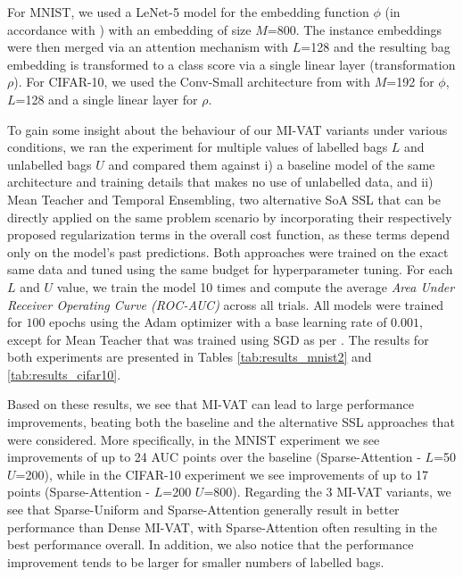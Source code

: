\documentclass[journal,twoside,web]{ieeecolor}
\begin{document}
For MNIST, we used a LeNet-5 model for the embedding function $\phi$ (in
accordance with \cite{pmlr-v80-ilse18a}) with  an embedding of size $M$=800. The
instance embeddings were then merged via an attention mechanism with  $L$=128
and the resulting bag embedding is transformed to a class score via a single
linear layer (transformation $\rho$). For CIFAR-10, we used the Conv-Small
architecture from \cite{Miyato2016a} with $M$=192 for $\phi$, $L$=128 
and a single linear layer for $\rho$.


To gain some insight about the behaviour of our MI-VAT variants under various
conditions, we ran the experiment for multiple values of labelled bags $L$ and
unlabelled bags $U$ and compared them against i) a baseline model of the same
architecture and training details that makes no use of unlabelled data, and ii)
Mean Teacher and Temporal Ensembling, two alternative SoA SSL that can be 
directly applied on the same problem scenario by incorporating their
respectively proposed  regularization terms in the overall cost function, as
these terms depend only on the model's past predictions. Both approaches were
trained on the exact same data and tuned using the same budget for
hyperparameter tuning. For each $L$ and $U$ value, we train the model 10 times
and compute the average \emph{Area Under Receiver Operating Curve (ROC-AUC)}
across all trials.  All models were trained for $100$ epochs using the Adam
optimizer with a base learning rate of $0.001$, except for Mean Teacher that was
trained using SGD as per \cite{tarvainen2017mean}. 
The results for both experiments are presented in Tables
\ref{tab:results_mnist2} and \ref{tab:results_cifar10}. 

Based on these results, we see that MI-VAT can lead to large performance improvements, 
beating both the baseline and the alternative
SSL approaches that were considered.
More specifically, in the MNIST experiment we see improvements of up to 24 AUC
points over the baseline (Sparse-Attention - $L$=50 $U$=200), while
in the CIFAR-10 experiment we see improvements of up to 17 points
(Sparse-Attention - $L$=200 $U$=800). Regarding the 3 MI-VAT variants,
we see that Sparse-Uniform and Sparse-Attention generally result in
better performance than Dense MI-VAT, with Sparse-Attention often
resulting in the best performance overall. In addition, we also notice that the
performance improvement tends to be larger for smaller numbers of labelled bags.
\end{document}
